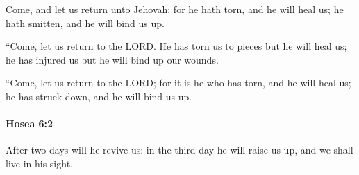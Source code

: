 			\begin{versebox}
					\item[BHS] 
					\item[LXX] 
					\item[ASV] Come, and let us return unto Jehovah; for he hath torn, and he will heal us; he hath smitten, and he will bind us up.
					\item[NIV] “Come, let us return to the LORD. He has torn us to pieces but he will heal us; he has injured us but he will bind up our wounds.
					\item[NRSV] “Come, let us return to the LORD; for it is he who has torn, and he will heal us; he has struck down, and he will bind us up.
			\end{versebox}

		\paragraph{Hosea 6:2} %
			\label{HOSEA-6-2}

			After two days will he revive us: in the third day he will raise us up, and we shall live in his sight.

